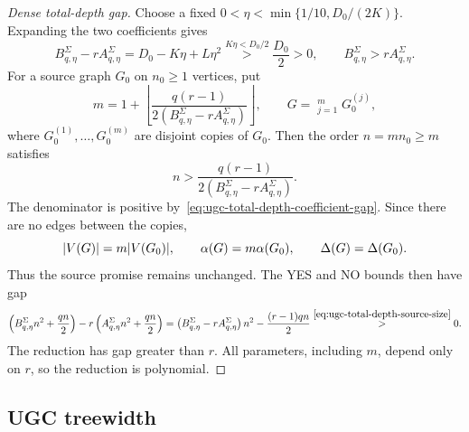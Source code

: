 \begin{proof}[Dense total-depth gap]
Choose a fixed
$0<\eta<\min\{1/10,D_0/(2K)\}$. Expanding the two coefficients gives
\begin{equation}\label{eq:ugc-total-depth-coefficient-gap}
B^{\Sigma}_{q,\eta}-rA^{\Sigma}_{q,\eta}
 =D_0-K\eta+L\eta^2
 \overset{K\eta<D_0/2}{>}\frac{D_0}{2}>0,\qquad B^{\Sigma}_{q,\eta}>rA^{\Sigma}_{q,\eta}.
\end{equation}
For a source graph $G_0$ on $n_0\geq1$ vertices, put
\[
 m=1+\left\lfloor
 \frac{q(r-1)}{2(B^{\Sigma}_{q,\eta}-rA^{\Sigma}_{q,\eta})}
 \right\rfloor,
 \qquad G=\mathop{\dot\bigcup}_{j=1}^{m}G_0^{(j)},
\]
where $G_0^{(1)},\ldots,G_0^{(m)}$ are disjoint copies of $G_0$.
Then the order $n=mn_0\geq m$ satisfies
\begin{equation}\label{eq:ugc-total-depth-source-size}
 n>\frac{q(r-1)}
 {2(B^{\Sigma}_{q,\eta}-rA^{\Sigma}_{q,\eta})}.
\end{equation}
The denominator is positive by~\eqref{eq:ugc-total-depth-coefficient-gap}.
Since there are no edges between the copies,
\[
 |V(G)|=m|V(G_0)|,\qquad
 \alpha(G)=m\alpha(G_0),\qquad
 \Delta(G)=\Delta(G_0).
\]
Thus the source promise remains unchanged. The YES and NO
bounds then have gap
\[
\left(B^{\Sigma}_{q,\eta}n^2+\frac{qn}{2}\right)
 -r\left(A^{\Sigma}_{q,\eta}n^2+\frac{qn}{2}\right)=\left(B^{\Sigma}_{q,\eta}-rA^{\Sigma}_{q,\eta}\right)n^2
   -\frac{(r-1)qn}{2}
   \overset{\eqref{eq:ugc-total-depth-source-size}}{>}0.
\]
The reduction has gap greater than $r$.
All parameters, including $m$, depend only on $r$, so the reduction
is polynomial.
\end{proof}

\subsection{UGC treewidth}
\label{app:dense-ugc-tw}

